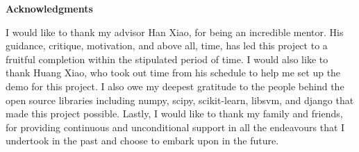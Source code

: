 \clearemptydoublepage
{}
{}	


\vspace*{2cm}

\begin{center}
{\Large \bf Acknowledgments}
\end{center}

\vspace{1cm}

I would like to thank my advisor Han Xiao, for being an incredible mentor. His guidance, critique, motivation, and above all, time, has led this project to a fruitful completion within the stipulated period of time. I would also like to thank Huang Xiao, who took out time from his schedule to help me set up the demo for this project. I also owe my deepest gratitude to the people behind the open source libraries including numpy, scipy, scikit-learn, libsvm, and django that made this project possible. Lastly, I would like to thank my family and friends, for providing continuous and unconditional support in all the endeavours that I undertook in the past and choose to embark upon in the future.
